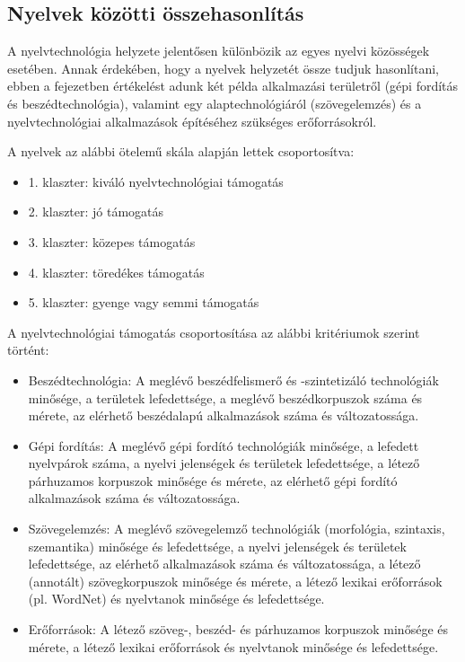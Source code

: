 \begin{multicols}{2}
\subsection{Nyelvek közötti összehasonlítás}

A nyelvtechnológia helyzete jelentősen különbözik az egyes nyelvi közösségek esetében. Annak érdekében, hogy a nyelvek helyzetét össze tudjuk hasonlítani, ebben a fejezetben értékelést adunk két példa alkalmazási területről (gépi fordítás és beszédtechnológia), valamint egy alaptechnológiáról (szövegelemzés) és a nyelvtechnológiai alkalmazások épí\-té\-sé\-hez szükséges erőforrásokról.

A nyelvek az alábbi ötelemű skála alapján lettek csoportosítva:

\begin{itemize}
\item 1. klaszter: kiváló nyelvtechnológiai támogatás
\item 2. klaszter: jó támogatás
\item 3. klaszter: közepes támogatás
\item 4. klaszter: töredékes támogatás
\item 5. klaszter: gyenge vagy semmi támogatás
\end{itemize}

A nyelvtechnológiai támogatás csoportosítása az alábbi kritériumok szerint történt:


\begin{itemize}
\item Beszédtechnológia: A meglévő beszédfelismerő és -szintetizáló technológiák minősége, a területek lefedettsége, a meglévő beszédkorpuszok száma és mérete, az elérhető beszédalapú alkalmazások száma és változatossága.
\item Gépi fordítás: A meglévő gépi fordító technológiák minősége, a lefedett nyelvpárok száma, a nyelvi jelenségek és területek lefedettsége, a létező párhuzamos korpuszok minősége és mérete, az elérhető gépi fordító alkalmazások száma és változatossága. 
\item Szövegelemzés: A meglévő szövegelemző technológiák (morfológia, szintaxis, szemantika) minősége és lefedettsége, a nyelvi jelenségek és területek lefedettsége, az elérhető alkalmazások száma és változatossága, a létező (annotált) szövegkorpuszok minősége és mérete, a létező lexikai erőforrások (pl. WordNet) és nyelvtanok minősége és lefedettsége. 
\item Erőforrások: A létező szöveg-, beszéd- és párhuzamos korpuszok minősége és mérete, a létező lexikai erőforrások és nyelvtanok minősége és lefedettsége.
\end{itemize}


\end{multicols}
